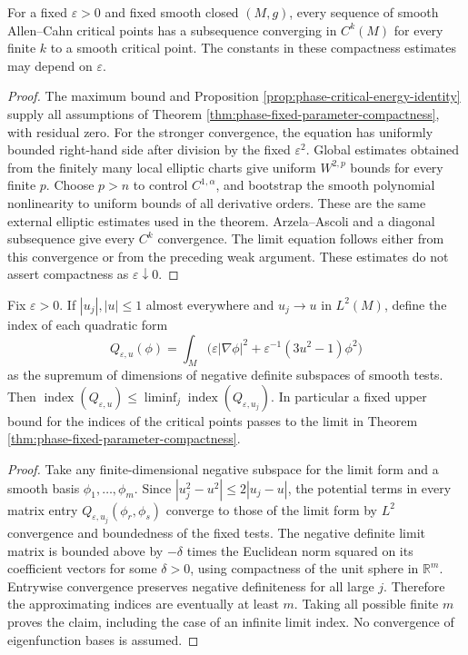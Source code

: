 \begin{corollary}\label{cor:phase-fixed-critical-set}
For a fixed $\varepsilon>0$ and fixed smooth closed $(M,g)$, every sequence of smooth Allen--Cahn critical points has a subsequence converging in $C^k(M)$ for every finite $k$ to a smooth critical point. The constants in these compactness estimates may depend on $\varepsilon$.
\end{corollary}
\begin{proof}
The maximum bound and Proposition \ref{prop:phase-critical-energy-identity} supply all assumptions of Theorem \ref{thm:phase-fixed-parameter-compactness}, with residual zero. For the stronger convergence, the equation has uniformly bounded right-hand side after division by the fixed $\varepsilon^2$. Global estimates obtained from the finitely many local elliptic charts give uniform $W^{2,p}$ bounds for every finite $p$. Choose $p>n$ to control $C^{1,\alpha}$, and bootstrap the smooth polynomial nonlinearity to uniform bounds of all derivative orders. These are the same external elliptic estimates used in the theorem. Arzela--Ascoli and a diagonal subsequence give every $C^k$ convergence. The limit equation follows either from this convergence or from the preceding weak argument. These estimates do not assert compactness as $\varepsilon\downarrow0$.
\end{proof}

\begin{proposition}\label{prop:phase-index-lower-semicontinuity}
Fix $\varepsilon>0$. If $|u_j|,|u|\leq1$ almost everywhere and $u_j\to u$ in $L^2(M)$, define the index of each quadratic form
\[
 Q_{\varepsilon,u}(\phi)=\int_M
       \bigl(\varepsilon|\nabla\phi|^2+\varepsilon^{-1}(3u^2-1)\phi^2\bigr)
\]
as the supremum of dimensions of negative definite subspaces of smooth tests. Then
$\operatorname{index}(Q_{\varepsilon,u})
\leq\liminf_j\operatorname{index}(Q_{\varepsilon,u_j})$.
In particular a fixed upper bound for the indices of the critical points passes to the limit in Theorem \ref{thm:phase-fixed-parameter-compactness}.
\end{proposition}
\begin{proof}
Take any finite-dimensional negative subspace for the limit form and a smooth basis $\phi_1,\ldots,\phi_m$. Since $|u_j^2-u^2|\leq2|u_j-u|$, the potential terms in every matrix entry $Q_{\varepsilon,u_j}(\phi_r,\phi_s)$ converge to those of the limit form by $L^2$ convergence and boundedness of the fixed tests. The negative definite limit matrix is bounded above by $-\delta$ times the Euclidean norm squared on its coefficient vectors for some $\delta>0$, using compactness of the unit sphere in $\mathbb R^m$. Entrywise convergence preserves negative definiteness for all large $j$. Therefore the approximating indices are eventually at least $m$. Taking all possible finite $m$ proves the claim, including the case of an infinite limit index. No convergence of eigenfunction bases is assumed.
\end{proof}

